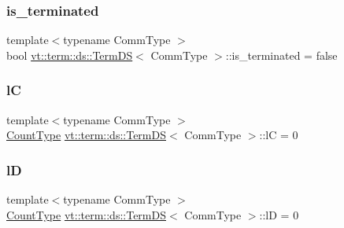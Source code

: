 \mbox{\label{structvt_1_1term_1_1ds_1_1_term_d_s_af53bdb81804df4d07dc7fd647329a89a}} 
\subsubsection{\texorpdfstring{is\+\_\+terminated}{is\_terminated}}
{\footnotesize\ttfamily template$<$typename Comm\+Type $>$ \\
bool \hyperlink{structvt_1_1term_1_1ds_1_1_term_d_s}{vt\+::term\+::ds\+::\+Term\+DS}$<$ Comm\+Type $>$\+::is\+\_\+terminated = false}

\mbox{\label{structvt_1_1term_1_1ds_1_1_term_d_s_a7b24d9eb35f71de23824ea8434a52cfd}} 
\subsubsection{\texorpdfstring{lC}{lC}}
{\footnotesize\ttfamily template$<$typename Comm\+Type $>$ \\
\hyperlink{structvt_1_1term_1_1ds_1_1_term_d_s_a54f4ebd7e1ecb59c32c0f5b03ef9f20b}{Count\+Type} \hyperlink{structvt_1_1term_1_1ds_1_1_term_d_s}{vt\+::term\+::ds\+::\+Term\+DS}$<$ Comm\+Type $>$\+::lC = 0\hspace{0.3cm}{\ttfamily [protected]}}

\mbox{\label{structvt_1_1term_1_1ds_1_1_term_d_s_acd01a2b3778d0510fe35f6497f33eda9}} 
\subsubsection{\texorpdfstring{lD}{lD}}
{\footnotesize\ttfamily template$<$typename Comm\+Type $>$ \\
\hyperlink{structvt_1_1term_1_1ds_1_1_term_d_s_a54f4ebd7e1ecb59c32c0f5b03ef9f20b}{Count\+Type} \hyperlink{structvt_1_1term_1_1ds_1_1_term_d_s}{vt\+::term\+::ds\+::\+Term\+DS}$<$ Comm\+Type $>$\+::lD = 0\hspace{0.3cm}{\ttfamily [protected]}}

